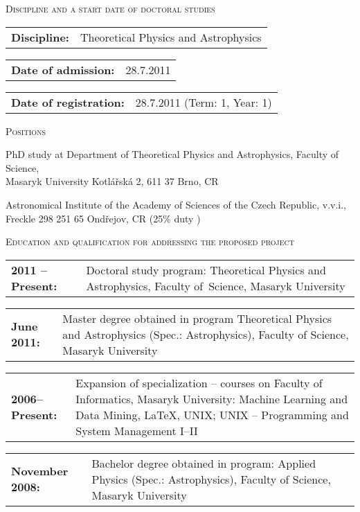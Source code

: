 \begin{cv}
\begin{cvlist}{\large \textsc{Discipline and a start date of doctoral studies}}
\item \begin{tabular}{p{4cm}p{11cm}} {\bf{Discipline:}} & Theoretical Physics and Astrophysics \end{tabular}
\item \begin{tabular}{p{4cm}p{11cm}} {\bf{Date of admission:}}  &  28.7.2011\end{tabular}
\item \begin{tabular}{p{4cm}p{11cm}} {\bf{Date of registration:}} & 28.7.2011 (Term: 1, Year: 1)\end{tabular}
\end{cvlist}




\begin{cvlist}{\large \textsc{Positions}}
\item PhD study at Department of Theoretical Physics and Astrophysics, Faculty of Science,\\ Masaryk University Kotl\'{a}\v{r}sk\'{a} 2, 611 37 Brno, CR
\item Astronomical Institute of the Academy of Sciences of the Czech
  Republic, v.v.i.,\\ Freckle 298 251 65 Ondřejov, CR (25\% duty )
\end{cvlist}

\noindent\hrulefill
\begin{cvlist}{\large \textsc{Education and qualification for addressing the proposed project}}
\item \begin{tabular}{p{2.8cm}p{11cm}} \vspace{0.2cm} {\bf{2011 --
      Present:}} & \vspace{0.2cm} Doctoral study program:
  Theoretical Physics and Astrophysics, Faculty of~Science, Masaryk
  University
 \end{tabular}
 \item \begin{tabular}{p{2.8cm}p{11cm}} {\bf{June 2011:}} & Master
   degree obtained in program Theoretical Physics and Astrophysics
   (Spec.: Astrophysics), Faculty of Science, Masaryk University
\end{tabular}
\item \begin{tabular}{p{2.8cm}p{11cm}} {\bf{2006--Present:}} &
  Expansion of specialization -- courses on Faculty of Informatics,
  Masaryk University: Machine Learning and Data Mining, \LaTeX, UNIX;
  UNIX -- Programming and System Management I--II
 \end{tabular}
  \item \begin{tabular}{p{2.8cm}p{11cm}} {\bf{November 2008:}} &
    Bachelor degree obtained in program: Applied Physics (Spec.:
    Astrophysics), Faculty of Science, Masaryk University
  \end{tabular}


\end{cvlist}
\end{cv}

